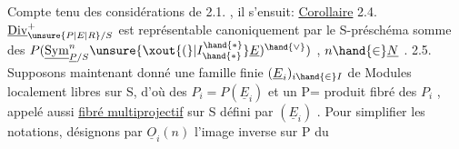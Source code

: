 Compte tenu des considérations de 2.1. , il s'ensuit:
\uline{Corollaire} 2.4. $\underline{\mathrm{Div}}^{+}_{\unsure{P|E|R}/S}$ est représentable canoniquement  par
le S-préschéma somme des $P(\underline{\mathrm{Sym}}^{n}_{\underline{P}/S}\unsure{\xout{(}|I^{\hand{*}}_{\hand{*}}}\underline{E})^{\hand{\vee}})$ , $n \hand{\in} \underline{N}$ .
2.5. Supposons maintenant donné une famille finie $(\underline{E}_i)_{i \hand{\in} I}$ de Modules
localement libres sur S, d'où des $P_i = P(\underline{E}_i)$ et un P= produit fibré des
$P_i$ , appelé aussi \uline{fibré multiprojectif} sur S défini par $(\underline{E}_i)$ . Pour
simplifier les notations, désignons par $\underline{O}_i(n)$ l'image inverse sur P du

